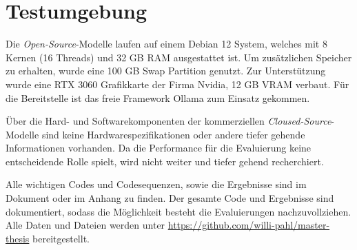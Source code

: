 


\section{Testumgebung}
Die \textit{Open-Source}-Modelle laufen auf einem Debian 12 System, welches mit 8 Kernen (16 Threads) und 32 GB RAM ausgestattet ist. Um zusätzlichen Speicher zu erhalten, wurde eine 100 GB Swap Partition genutzt. Zur Unterstützung wurde eine RTX 3060 Grafikkarte der Firma Nvidia, 12 GB VRAM verbaut. Für die Bereitstelle ist das freie Framework Ollama zum Einsatz gekommen.\vspace{0.2cm}

Über die Hard- und Softwarekomponenten der kommerziellen \textit{Cloused-Source}-Modelle sind keine Hardwarespezifikationen oder andere tiefer gehende Informationen vorhanden. Da die Performance für die Evaluierung keine entscheidende Rolle spielt, wird nicht weiter und tiefer gehend recherchiert. \vspace{0.2cm}

Alle wichtigen Codes und Codesequenzen, sowie die Ergebnisse sind im Dokument oder im Anhang zu finden. Der gesamte Code und Ergebnisse sind dokumentiert, sodass die Möglichkeit besteht die Evaluierungen nachzuvollziehen. Alle Daten und Dateien werden unter \href{https://github.com/willi-pahl/master-thesis}{https://github.com/willi-pahl/master-thesis} bereitgestellt.\vspace{0.2cm}


